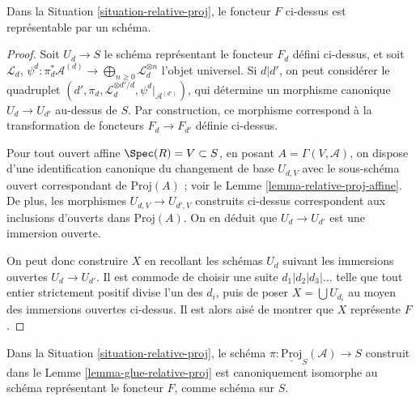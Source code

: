 \begin{lemma}
\label{lemma-relative-proj}
Dans la Situation \ref{situation-relative-proj}, le foncteur $F$ ci-dessus
est représentable par un schéma.
\end{lemma}

\begin{proof}
Soit $U_d \to S$ le schéma représentant le foncteur $F_d$ défini ci-dessus,
et soit $\mathcal{L}_d$,
$\psi^d : \pi_d^*\mathcal{A}^{(d)} \to
\bigoplus_{n \geq 0} \mathcal{L}_d^{\otimes n}$ l'objet universel.
Si $d | d'$, on peut considérer le quadruplet
$(d', \pi_d, \mathcal{L}_d^{\otimes d'/d}, \psi^d|_{\mathcal{A}^{(d')}})$,
qui détermine un morphisme canonique $U_d \to U_{d'}$ au-dessus de $S$.
Par construction, ce morphisme correspond à la transformation de foncteurs
$F_d \to F_{d'}$ définie ci-dessus.

\medskip\noindent
Pour tout ouvert affine $\Spec(R) = V \subset S$, en posant
$A = \Gamma(V, \mathcal{A})$, on dispose d'une identification canonique
du changement de base $U_{d, V}$ avec le sous-schéma ouvert correspondant
de $\text{Proj}(A)$ ; voir le Lemme \ref{lemma-relative-proj-affine}.
De plus, les morphismes $U_{d, V} \to U_{d', V}$ construits ci-dessus
correspondent aux inclusions d'ouverts dans $\text{Proj}(A)$.
On en déduit que $U_d \to U_{d'}$ est une immersion ouverte.

\medskip\noindent
On peut donc construire $X$ en recollant les schémas $U_d$ suivant les
immersions ouvertes $U_d \to U_{d'}$.
Il est commode de choisir une suite
$d_1 | d_2 | d_3 | \ldots$ telle que
tout entier strictement positif divise
l'un des $d_i$, puis de poser
$X = \bigcup U_{d_i}$ au moyen des immersions
ouvertes ci-dessus. Il est alors aisé de montrer que $X$ représente $F$.
\end{proof}

\begin{lemma}
\label{lemma-glueing-gives-functor-proj}
Dans la Situation \ref{situation-relative-proj}, le schéma
$\pi : \underline{\text{Proj}}_S(\mathcal{A}) \to S$ construit dans le
Lemme \ref{lemma-glue-relative-proj} est canoniquement
isomorphe au schéma représentant le foncteur $F$,
comme schéma sur $S$.
\end{lemma}

